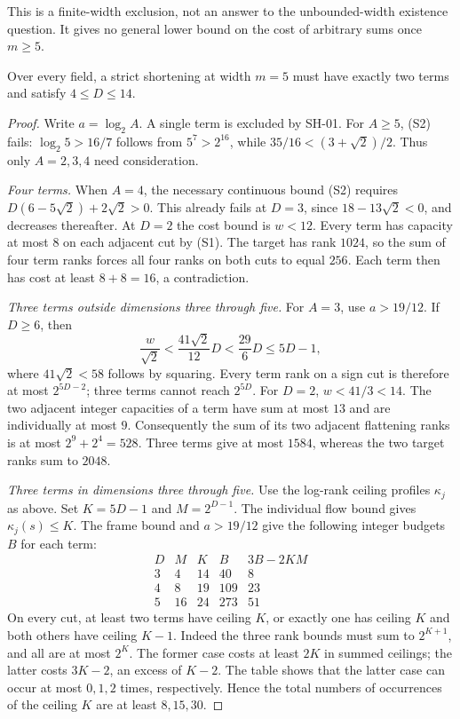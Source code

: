This is a finite-width exclusion, not an answer to the
unbounded-width existence question.  It gives no general
lower bound on the cost of arbitrary sums once $m\ge5$.

\begin{proposition}
\label{prop:width-five-parameters}
Over every field, a strict shortening at width $m=5$ must
have exactly two terms and satisfy $4\le D\le14$.
\end{proposition}
\begin{proof}
Write $a=\log_2 A$.  A single term is excluded by SH-01.
For $A\ge5$, (S2) fails: $\log_2 5>16/7$ follows from
$5^7>2^{16}$, while $35/16<(3+\sqrt2)/2$.
Thus only $A=2,3,4$ need consideration.

\emph{Four terms.}
When $A=4$, the necessary continuous bound (S2) requires
$D(6-5\sqrt2)+2\sqrt2>0$.  This already fails at
$D=3$, since $18-13\sqrt2<0$, and decreases thereafter.
At $D=2$ the cost bound is $w<12$.  Every term has
capacity at most $8$ on each adjacent cut by (S1).
The target has rank $1024$, so the sum of four term
ranks forces all four ranks on both cuts to equal $256$.
Each term then has cost at least $8+8=16$, a contradiction.

\emph{Three terms outside dimensions three through five.}
For $A=3$, use $a>19/12$.  If $D\ge6$, then
\[
 \frac w{\sqrt2}<\frac{41\sqrt2}{12}D
 <\frac{29}{6}D\le5D-1,
\]
where $41\sqrt2<58$ follows by squaring.
Every term rank on a sign cut is therefore at most
$2^{5D-2}$; three terms cannot reach $2^{5D}$.
For $D=2$, $w<41/3<14$.  The two adjacent integer
capacities of a term have sum at most $13$ and are
individually at most $9$.  Consequently the sum of its
two adjacent flattening ranks is at most
$2^9+2^4=528$.  Three terms give at most $1584$,
whereas the two target ranks sum to $2048$.

\emph{Three terms in dimensions three through five.}
Use the log-rank ceiling profiles $\kappa_j$ as above.
Set $K=5D-1$ and $M=2^{D-1}$.
The individual flow bound gives $\kappa_j(s)\le K$.
The frame bound and $a>19/12$ give the following
integer budgets $B$ for each term:
\[
\begin{array}{c|r|r|r|r}
 D&M&K&B&3B-2KM\\\hline
 3&4&14&40&8\\
 4&8&19&109&23\\
 5&16&24&273&51
\end{array}
\]
On every cut, at least two terms have ceiling $K$, or
exactly one has ceiling $K$ and both others have ceiling
$K-1$.  Indeed the three rank bounds must sum to
$2^{K+1}$, and all are at most $2^K$.
The former case costs at least $2K$ in summed ceilings;
the latter costs $3K-2$, an excess of $K-2$.
The table shows that the latter case can occur at most
$0,1,2$ times, respectively.  Hence the total numbers
of occurrences of the ceiling $K$ are at least
$8,15,30$.


\end{proof}
